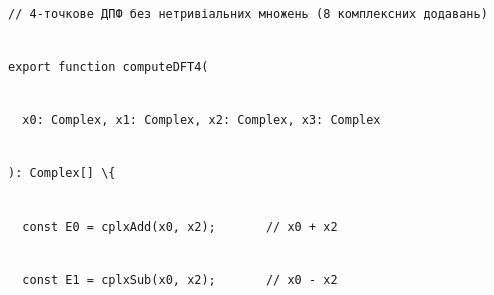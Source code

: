 \documentclass[
]{article}
\newcommand{\passthrough}[1]{#1}
\begin{document}
\strut \\
\passthrough{\lstinline!//!}\passthrough{\lstinline! !}\passthrough{\lstinline!4-точкове!}\passthrough{\lstinline! !}\passthrough{\lstinline!ДПФ!}\passthrough{\lstinline! !}\passthrough{\lstinline!без!}\passthrough{\lstinline! !}\passthrough{\lstinline!нетривіальних!}\passthrough{\lstinline! !}\passthrough{\lstinline!множень!}\passthrough{\lstinline! !}\passthrough{\lstinline!(8!}\passthrough{\lstinline! !}\passthrough{\lstinline!комплексних!}\passthrough{\lstinline! !}\passthrough{\lstinline!додавань!}\passthrough{\lstinline!)!}\strut \\
\passthrough{\lstinline!export!}\passthrough{\lstinline! !}\passthrough{\lstinline!function!}\passthrough{\lstinline! !}\passthrough{\lstinline!computeDFT!}\passthrough{\lstinline!4(!}\strut \\
\passthrough{\lstinline!  !}\passthrough{\lstinline!x!}\passthrough{\lstinline!0:!}\passthrough{\lstinline! !}\passthrough{\lstinline!Complex!}\passthrough{\lstinline!,!}\passthrough{\lstinline! !}\passthrough{\lstinline!x!}\passthrough{\lstinline!1:!}\passthrough{\lstinline! !}\passthrough{\lstinline!Complex!}\passthrough{\lstinline!,!}\passthrough{\lstinline! !}\passthrough{\lstinline!x!}\passthrough{\lstinline!2:!}\passthrough{\lstinline! !}\passthrough{\lstinline!Complex!}\passthrough{\lstinline!,!}\passthrough{\lstinline! !}\passthrough{\lstinline!x!}\passthrough{\lstinline!3:!}\passthrough{\lstinline! !}\passthrough{\lstinline!Complex!}\strut \\
\passthrough{\lstinline!):!}\passthrough{\lstinline! !}\passthrough{\lstinline!Complex!}\passthrough{\lstinline![]!}\passthrough{\lstinline! !}\passthrough{\lstinline!\{!}\strut \\
\passthrough{\lstinline!  !}\passthrough{\lstinline!const!}\passthrough{\lstinline! !}\passthrough{\lstinline!E!}\passthrough{\lstinline!0!}\passthrough{\lstinline! !}\passthrough{\lstinline!=!}\passthrough{\lstinline! !}\passthrough{\lstinline!cplxAdd!}\passthrough{\lstinline!(!}\passthrough{\lstinline!x!}\passthrough{\lstinline!0,!}\passthrough{\lstinline! !}\passthrough{\lstinline!x!}\passthrough{\lstinline!2);!}\passthrough{\lstinline!       !}\passthrough{\lstinline!//!}\passthrough{\lstinline! !}\passthrough{\lstinline!x!}\passthrough{\lstinline!0!}\passthrough{\lstinline! !}\passthrough{\lstinline!+!}\passthrough{\lstinline! !}\passthrough{\lstinline!x!}\passthrough{\lstinline!2!}\strut \\
\passthrough{\lstinline!  !}\passthrough{\lstinline!const!}\passthrough{\lstinline! !}\passthrough{\lstinline!E!}\passthrough{\lstinline!1!}\passthrough{\lstinline! !}\passthrough{\lstinline!=!}\passthrough{\lstinline! !}\passthrough{\lstinline!cplxSub!}\passthrough{\lstinline!(!}\passthrough{\lstinline!x!}\passthrough{\lstinline!0,!}\passthrough{\lstinline! !}\passthrough{\lstinline!x!}\passthrough{\lstinline!2);!}\passthrough{\lstinline!       !}\passthrough{\lstinline!//!}\passthrough{\lstinline! !}\passthrough{\lstinline!x!}\passthrough{\lstinline!0!}\passthrough{\lstinline! !}\passthrough{\lstinline!-!}\passthrough{\lstinline! !}\passthrough{\lstinline!x!}\passthrough{\lstinline!2!}\strut \\
\end{document}
